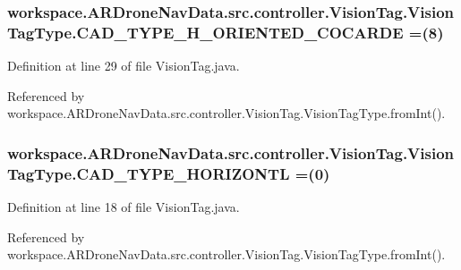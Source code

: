 \subsubsection[{C\+A\+D\+\_\+\+T\+Y\+P\+E\+\_\+\+H\+\_\+\+O\+R\+I\+E\+N\+T\+E\+D\+\_\+\+C\+O\+C\+A\+R\+D\+E}]{\setlength{\rightskip}{0pt plus 5cm}workspace.\+A\+R\+Drone\+Nav\+Data.\+src.\+controller.\+Vision\+Tag.\+Vision\+Tag\+Type.\+C\+A\+D\+\_\+\+T\+Y\+P\+E\+\_\+\+H\+\_\+\+O\+R\+I\+E\+N\+T\+E\+D\+\_\+\+C\+O\+C\+A\+R\+D\+E =(8)}\label{enumworkspace_1_1_a_r_drone_nav_data_1_1src_1_1controller_1_1_vision_tag_1_1_vision_tag_type_a9d4c4d9ed65610fe2c42f9c896588b12}


Definition at line 29 of file Vision\+Tag.\+java.



Referenced by workspace.\+A\+R\+Drone\+Nav\+Data.\+src.\+controller.\+Vision\+Tag.\+Vision\+Tag\+Type.\+from\+Int().

\hypertarget{enumworkspace_1_1_a_r_drone_nav_data_1_1src_1_1controller_1_1_vision_tag_1_1_vision_tag_type_a60eb4abf00641492c9290ab815a12d83}{}
\subsubsection[{C\+A\+D\+\_\+\+T\+Y\+P\+E\+\_\+\+H\+O\+R\+I\+Z\+O\+N\+T\+L}]{\setlength{\rightskip}{0pt plus 5cm}workspace.\+A\+R\+Drone\+Nav\+Data.\+src.\+controller.\+Vision\+Tag.\+Vision\+Tag\+Type.\+C\+A\+D\+\_\+\+T\+Y\+P\+E\+\_\+\+H\+O\+R\+I\+Z\+O\+N\+T\+L =(0)}\label{enumworkspace_1_1_a_r_drone_nav_data_1_1src_1_1controller_1_1_vision_tag_1_1_vision_tag_type_a60eb4abf00641492c9290ab815a12d83}


Definition at line 18 of file Vision\+Tag.\+java.



Referenced by workspace.\+A\+R\+Drone\+Nav\+Data.\+src.\+controller.\+Vision\+Tag.\+Vision\+Tag\+Type.\+from\+Int().

